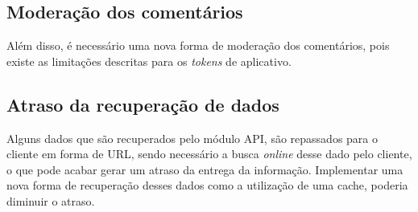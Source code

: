 \subsection{Moderação dos comentários}
Além disso, é necessário uma nova forma de moderação dos comentários, pois existe as limitações descritas para os \textit{tokens} de aplicativo.

\subsection{Atraso da recuperação de dados}
Alguns dados que são recuperados pelo módulo API, são repassados para o cliente em forma de URL, sendo necessário a busca \textit{online} desse dado pelo cliente, o que pode acabar gerar um atraso da entrega da informação. Implementar uma nova forma de recuperação desses dados como a utilização de uma cache, poderia diminuir o atraso. 